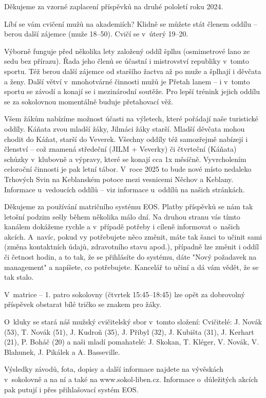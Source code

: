 \documentclass[11pt]{article}
\begin{document}
Děkujeme za vzorné zaplacení příspěvků na druhé pololetí roku 2024.

Líbí se vám cvičení mužů na akademiích? Klidně se můžete stát členem oddílu – berou další zájemce (muže 18–50). Cvičí se v~úterý 19–20. 

Výborně funguje před několika lety založený oddíl šplhu (osmimetrové lano ze sedu bez přírazu). Řada jeho členů se účastní i mistrovství republiky v~tomto sportu. Též berou další zájemce od staršího žactva až po muže a šplhají i děvčata a ženy. Další větví v~mnohotvárné činnosti mužů je Přetah lanem – i v~tomto sportu se závodí a konají se i mezinárodní soutěže. Pro lepší trénink jejich oddílu se za sokolovnou momentálně buduje přetahovací věž. 

Všem žákům nabízíme možnost účasti na výletech, které pořádají naše turistické oddíly. Káňata zvou mladší žáky, Jilmáci žáky starší. Mladší děvčata mohou chodit do Káňat, starší do Veverek. Všechny oddíly též samozřejmě nabízejí i členství – což znamená středeční (JILM + Veverky) či čtvrteční (Káňata) schůzky v~klubovně a výpravy, které se konají cca 1x měsíčně. Vyvrcholením celoroční činnosti je pak letní tábor. V~roce 2025 to bude nové místo nedaleko Trhových Svin na Keblanském potoce mezi vesnicemi Něchov a Keblany. Informace u~vedoucích oddílů – viz informace u~oddílů na našich stránkách. 

Děkujeme za používání matričního systému EOS. Platby příspěvků se nám tak letošní podzim sešly během několika málo dní. Na druhou stranu vás tímto kanálem dokážeme rychle a v~případě potřeby i cíleně informovat o~našich akcích. A~navíc, pokud vy potřebujete něco změnit, máte tak šanci to učinit sami (změna kontaktních údajů, zdravotního stavu apod.), případně lze změnit i oddíl či četnost hodin, a to tak, že se přihlásíte do systému, dáte "Nový požadavek na management" a napíšete, co potřebujete. Kancelář to učiní a dá vám vědět, že se tak stalo. 

V~matrice – 1. patro sokolovny (čtvrtek 15:45–18:45) lze opět za dobrovolný příspěvek obstarat bílé tričko se znakem pro žáky.

O~kluky se stará náš mužský cvičitelský sbor v~tomto složení:
Cvičitelé: J. Novák (53), T. Novák (51), J. Kudroň (35), J. Přibyl (32), J. Kubišta (31), J. Kerhart (21), P. Boháč (20) a naši mladí pomahatelé: J. Skokan, T. Kléger, V. Novák, V. Blahunek, J. Pikálek a A. Basseville. 

Výsledky závodů, fota, dopisy a další informace najdete na vývěskách v~sokolovně a na ní a také na www.sokol-liben.cz. Informace o~důležitých akcích pak putují i přes přihlašovací systém EOS.
\end{document}
